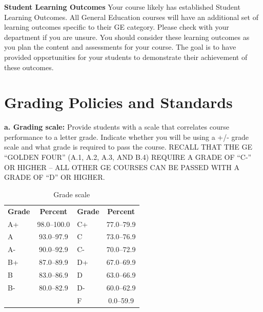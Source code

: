 \documentclass[12pt]{article} %
\begin{document}
\vspace{1em}

\noindent \textbf{Student Learning Outcomes} {\color{annotationblue}Your course likely has established Student Learning Outcomes. All General Education courses will have an additional set of learning outcomes specific to their GE category. Please check with your department if you are unsure. You should consider these learning outcomes as you plan the content and assessments for your course. The goal is to have provided opportunities for your students to demonstrate their achievement of these outcomes.}

\section*{Grading Policies and Standards}

\noindent \textbf{a. Grading scale:} {\color{annotationblue}Provide students with a scale that correlates course performance to a letter grade. Indicate whether you will be using a +/- grade scale and what grade is required to pass the course. RECALL THAT THE GE ``GOLDEN FOUR'' (A.1, A.2, A.3, AND B.4) REQUIRE A GRADE OF ``C-'' OR HIGHER -- ALL OTHER GE COURSES CAN BE PASSED WITH A GRADE OF ``D'' OR HIGHER.}

\vspace{0.5em}


\vspace{0.5em}

\begin{center}
\begin{table}[h]
  \caption{Grade scale}
  \centering
  \begin{tabular}{l c l c}
  \rowcolor{csufTableHeader}
  \textbf{Grade} & \textbf{Percent} & \textbf{Grade} & \textbf{Percent} \\
  A+    & 98.0--100.0 & C+    & 77.0--79.9 \\
  A     & 93.0--97.9  & C     & 73.0--76.9 \\
  A-    & 90.0--92.9  & C-    & 70.0--72.9 \\
  B+    & 87.0--89.9  & D+    & 67.0--69.9 \\
  B     & 83.0--86.9  & D     & 63.0--66.9 \\
  B-    & 80.0--82.9  & D-    & 60.0--62.9 \\
        &             & F     & 0.0--59.9 \\
  \end{tabular}
  \label{tab:grading_scale}
\end{table}
\end{center}
\end{document}
